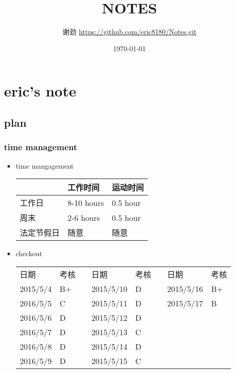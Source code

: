 \documentclass[11pt]{article}
\author{谢劲  \url{https://github.com/eric8180/Notes.git}}
\date{\today}
\title{NOTES}
\begin{document}
\maketitle
\tableofcontents



\section{eric's note}
\label{sec-1}
\subsection{plan}
\label{sec-1-1}
\subsubsection{time management}
\label{sec-1-1-1}

\begin{itemize}
\item time mangagement
\begin{center}
\begin{tabular}{lll}
 & 工作时间 & 运动时间\\
\hline
工作日 & 8-10 hours & 0.5 hour\\
周末 & 2-6 hours & 0.5 hour\\
法定节假日 & 随意 & 随意\\
\end{tabular}
\end{center}
\end{itemize}



\begin{itemize}
\item checkout
\begin{center}
\begin{tabular}{llllllll}
日期 & 考核 &  & 日期 & 考核 &  & 日期 & 考核\\
2015/5/4 & B+ &  & 2015/5/10 & D &  & 2015/5/16 & B+\\
2016/5/5 & C &  & 2015/5/11 & D &  & 2015/5/17 & B\\
2016/5/6 & D &  & 2015/5/12 & D &  &  & \\
2016/5/7 & D &  & 2015/5/13 & C &  &  & \\
2016/5/8 & D &  & 2015/5/14 & D &  &  & \\
2016/5/9 & D &  & 2015/5/15 & C &  &  & \\
\end{tabular}
\end{center}
\end{itemize}
\end{document}
